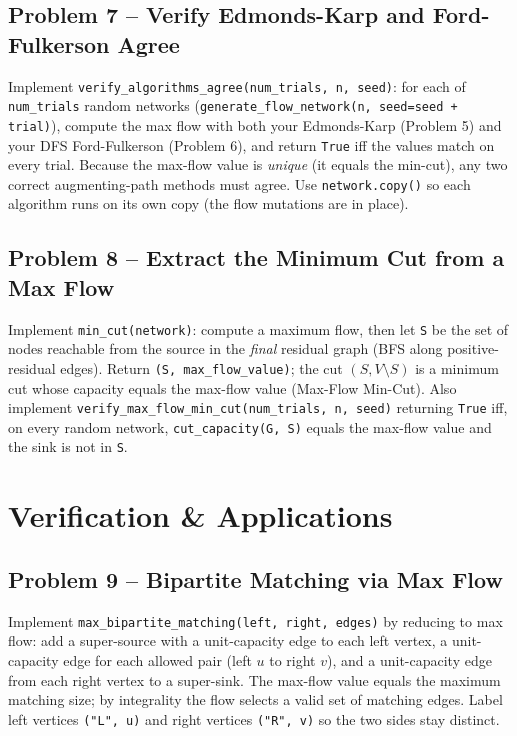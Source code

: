 \documentclass[11pt]{article}
\begin{document}
\subsection*{Problem 7 -- Verify Edmonds-Karp and Ford-Fulkerson Agree}

Implement \texttt{verify\_algorithms\_agree(num\_trials, n, seed)}: for each of
\texttt{num\_trials} random networks (\texttt{generate\_flow\_network(n, seed=seed +
trial)}), compute the max flow with both your Edmonds-Karp (Problem 5) and your DFS
Ford-Fulkerson (Problem 6), and return \texttt{True} iff the values match on every trial.
Because the max-flow value is \emph{unique} (it equals the min-cut), any two correct
augmenting-path methods must agree. Use \texttt{network.copy()} so each algorithm runs on
its own copy (the flow mutations are in place).

\subsection*{Problem 8 -- Extract the Minimum Cut from a Max Flow}

Implement \texttt{min\_cut(network)}: compute a maximum flow, then let \texttt{S} be the
set of nodes reachable from the source in the \emph{final} residual graph (BFS along
positive-residual edges). Return \texttt{(S, max\_flow\_value)}; the cut $(S, V\setminus
S)$ is a minimum cut whose capacity equals the max-flow value (Max-Flow Min-Cut). Also
implement \texttt{verify\_max\_flow\_min\_cut(num\_trials, n, seed)} returning \texttt{True}
iff, on every random network, \texttt{cut\_capacity(G, S)} equals the max-flow value and
the sink is not in \texttt{S}.

\newpage
\section{Verification \& Applications}

\subsection*{Problem 9 -- Bipartite Matching via Max Flow}

Implement \texttt{max\_bipartite\_matching(left, right, edges)} by reducing to max flow:
add a super-source with a unit-capacity edge to each left vertex, a unit-capacity edge for
each allowed pair (left $u$ to right $v$), and a unit-capacity edge from each right vertex
to a super-sink. The max-flow value equals the maximum matching size; by integrality the
flow selects a valid set of matching edges. Label left vertices \texttt{("L", u)} and right
vertices \texttt{("R", v)} so the two sides stay distinct.
\end{document}
